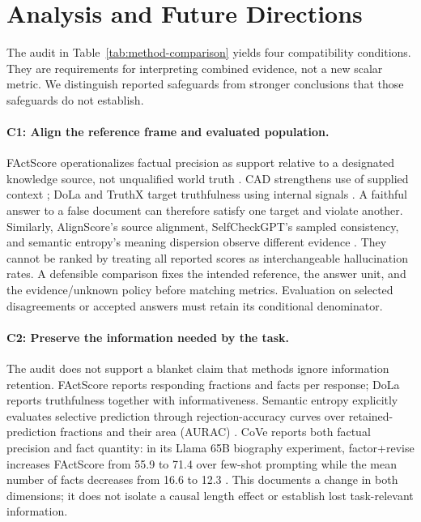 \section{Analysis and Future Directions}\label{sec:analysis}
The audit in Table~\ref{tab:method-comparison} yields four compatibility conditions. They are requirements for interpreting combined evidence, not a new scalar metric. We distinguish reported safeguards from stronger conclusions that those safeguards do not establish.

\paragraph{C1: Align the reference frame and evaluated population.}
FActScore operationalizes factual precision as support relative to a designated knowledge source, not unqualified world truth \citep[\S3.1]{min-etal-2023-factscore}. CAD strengthens use of supplied context \citep{shi-etal-2024-trusting}; DoLa and TruthX target truthfulness using internal signals \citep{extdola2024,zhang-etal-2024-truthx}. A faithful answer to a false document can therefore satisfy one target and violate another. Similarly, AlignScore's source alignment, SelfCheckGPT's sampled consistency, and semantic entropy's meaning dispersion observe different evidence \citep{zha-etal-2023-alignscore,manakul-etal-2023-selfcheckgpt,extsemanticentropy2024}. They cannot be ranked by treating all reported scores as interchangeable hallucination rates. A defensible comparison fixes the intended reference, the answer unit, and the evidence/unknown policy before matching metrics. Evaluation on selected disagreements or accepted answers must retain its conditional denominator.

\paragraph{C2: Preserve the information needed by the task.}
The audit does not support a blanket claim that methods ignore information retention. FActScore reports responding fractions and facts per response; DoLa reports truthfulness together with informativeness. Semantic entropy explicitly evaluates selective prediction through rejection-accuracy curves over retained-prediction fractions and their area (AURAC) \citep{extsemanticentropy2024}. CoVe reports both factual precision and fact quantity: in its Llama 65B biography experiment, factor+revise increases FActScore from 55.9 to 71.4 over few-shot prompting while the mean number of facts decreases from 16.6 to 12.3 \citep[Table 3]{dhuliawala-etal-2024-chain}. This documents a change in both dimensions; it does not isolate a causal length effect or establish lost task-relevant information.

